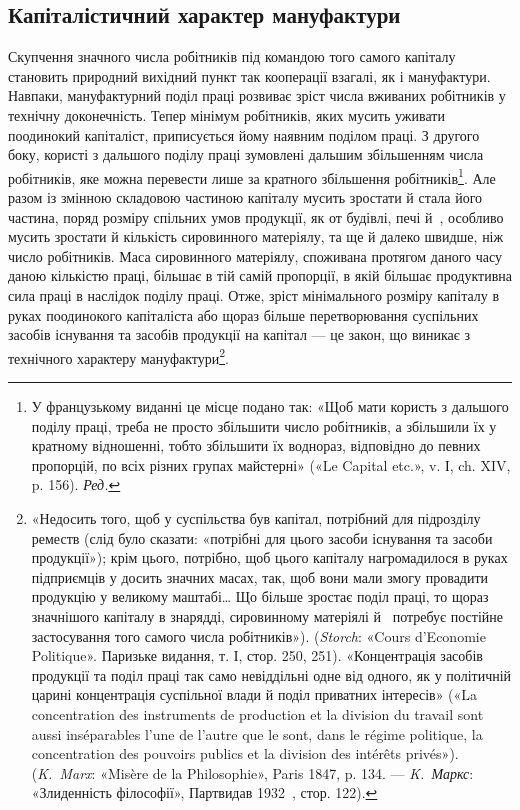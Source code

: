 \subsection{Капіталістичний характер мануфактури}

Скупчення значного числа робітників під командою того
самого капіталу становить природний вихідний пункт так кооперації
взагалі, як і мануфактури. Навпаки, мануфактурний поділ
праці розвиває зріст числа вживаних робітників у технічну
доконечність. Тепер мінімум робітників, яких мусить уживати
поодинокий капіталіст, приписується йому наявним поділом
праці. З другого боку, користі з дальшого поділу праці зумовлені
дальшим збільшенням числа робітників, яке можна перевести
лише за кратного збільшення робітників\footnote*{
У французькому виданні це місце подано так: «Щоб мати користь
з дальшого поділу праці, треба не просто збільшити число робітників, а
збільшили їх у кратному відношенні, тобто збільшити їх воднораз,
відповідно до певних пропорцій, по всіх різних групах майстерні» («Le
Capital etc.», v. І, ch. XIV, p. 156). \emph{Ред.}
}. Але разом із
змінною складовою частиною капіталу мусить зростати й стала
його частина, поряд розміру спільних умов продукції, як от
будівлі, печі й~, особливо мусить зростати й кількість сировинного
матеріялу, та ще й далеко швидше, ніж число робітників.
Маса сировинного матеріялу, споживана протягом даного
часу даною кількістю праці, більшає в тій самій пропорції, в
якій більшає продуктивна сила праці в наслідок поділу праці.
Отже, зріст мінімального розміру капіталу в руках поодинокого
капіталіста або щораз більше перетворювання суспільних засобів
існування та засобів продукції на капітал — це закон, що
виникає з технічного характеру мануфактури\footnote{
«Недосить того, щоб у суспільства був капітал, потрібний для
підрозділу реместв (слід було сказати: «потрібні для цього засоби
існування та засоби продукції»); крім цього, потрібно, щоб цього капіталу
нагромадилося в руках підприємців у досить значних масах, так, щоб
вони мали змогу провадити продукцію у великому маштабі\dots{} Що більше
зростає поділ праці, то щораз значнішого капіталу в знарядді,
сировинному матеріялі й~ потребує постійне застосування того самого числа
робітників»). (\emph{Storch}: «Cours d’Economie Politique». Паризьке видання,
т. І, стор. 250, 251). «Концентрація засобів продукції та поділ
праці так само невіддільні одне від одного, як у політичній царині
концентрація суспільної влади й поділ приватних інтересів» («La
concentration des instruments de production et la division du travail sont aussi
inséparables l’une de l’autre que le sont, dans le régime politique, la
concentration des pouvoirs publics et la division des intérêts privés»).
(\emph{K.~Marx}: «Misère de la Philosophie», Paris 1847, p. 134. — \emph{K.~Маркс}:
«Злиденність філософії», Партвидав 1932~, стор. 122).
}.

